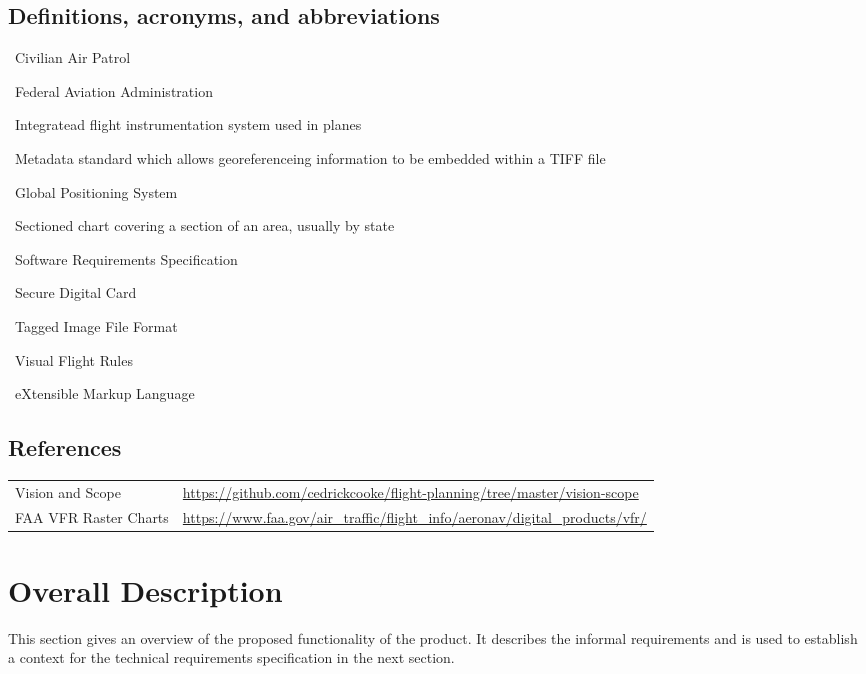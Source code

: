 \documentclass[12pt, letterpaper]{article}
\begin{document}
  \subsection{Definitions, acronyms, and abbreviations} \label{sec:glossary}
\begin{description}[style=nextline, leftmargin=10mm, topsep=0mm,noitemsep]
      \item[CAP] \hfill \ Civilian Air Patrol
      \item[FAA] \hfill \ Federal Aviation Administration
      \item[Garmin G1000] \hfill \ Integratead flight instrumentation system used in planes
      \item[GeoTIFF] \hfill \ Metadata standard which allows georeferenceing information to be embedded within a TIFF file
      \item[GPS] \hfill \ Global Positioning System
      \item[Sectional] \hfill \ Sectioned chart covering a section of an area, usually by state
      \item[SRS] \hfill \ Software Requirements Specification
      \item[SD Card] \hfill \ Secure Digital Card
      \item[TIFF] \hfill \ Tagged Image File Format
      \item[VFR] \hfill \ Visual Flight Rules
      \item[XML] \hfill \ eXtensible Markup Language
  \end{description}

  \subsection{References}\label{sec:ref}
  \begin{tabularx}{\textwidth}{l|X}
    \hline
    Vision and Scope & \url{https://github.com/cedrickcooke/flight-planning/tree/master/vision-scope}\\
    FAA VFR Raster Charts & \url{https://www.faa.gov/air_traffic/flight_info/aeronav/digital_products/vfr/} \\
    \hline
  \end{tabularx}

  \newpage
\section{Overall Description}
  This section gives an overview of the proposed functionality of the product.
  It describes the informal requirements and is used to establish a context for the technical
  requirements specification in the next section.
\end{document}
